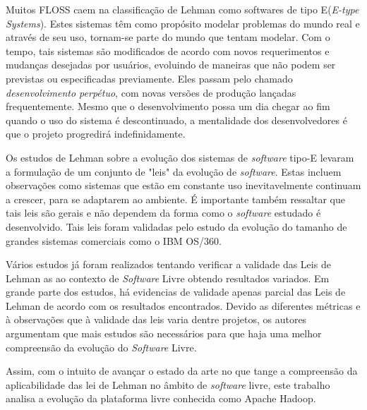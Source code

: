 Muitos FLOSS caem na classificação de Lehman\cite{belady1976model} como softwares de tipo E(\textit{E-type Systems}). Estes sistemas têm como propósito modelar problemas do mundo real e através de seu uso, tornam-se parte do mundo que tentam modelar. Com o tempo, tais sistemas são modificados de acordo com novos requerimentos e mudanças desejadas por usuários, evoluindo de maneiras que não podem ser previstas ou especificadas previamente. Eles passam pelo chamado \textit{desenvolvimento perpétuo}\cite{lehman1996laws}, com novas versões de produção lançadas frequentemente. Mesmo que o desenvolvimento possa um dia chegar ao fim quando o uso do sistema é descontinuado, a mentalidade dos desenvolvedores é que o projeto progredirá indefinidamente.

Os estudos de Lehman sobre a evolução dos sistemas de \textit{software} tipo-E levaram a formulação de um conjunto de "leis" da evolução de \textit{software}. Estas incluem observações como sistemas que estão em constante uso inevitavelmente continuam a crescer, para se adaptarem ao ambiente. É importante também ressaltar que tais leis são gerais e não dependem da forma como o \textit{software} estudado é desenvolvido. Tais leis foram validadas pelo estudo da evolução do tamanho de grandes sistemas comerciais como o IBM OS/360\cite{lehman1979understanding,lehman1985program}. 

Vários estudos já foram realizados tentando verificar a validade das Leis de Lehman as ao contexto de \textit{Software} Livre obtendo resultados variados. Em grande parte dos estudos, há evidencias de validade apenas parcial das Leis de Lehman de acordo com os resultados encontrados\cite{lehman1979understanding,lehman1985program,israeli2010linux,carver2004impact}. Devido as diferentes métricas e à observações que à validade das leis varia dentre projetos, os autores argumentam que mais estudos são necessários para que haja uma melhor compreensão da evolução do \textit{Software} Livre\cite{scacchi2003understanding,neamtiu2013towards,israeli2010linux}.

Assim, com o intuito de avançar o estado da arte no que tange a compreensão da aplicabilidade das lei de Lehman no âmbito de \textit{software} livre, este trabalho analisa a evolução da plataforma livre conhecida como Apache Hadoop.

